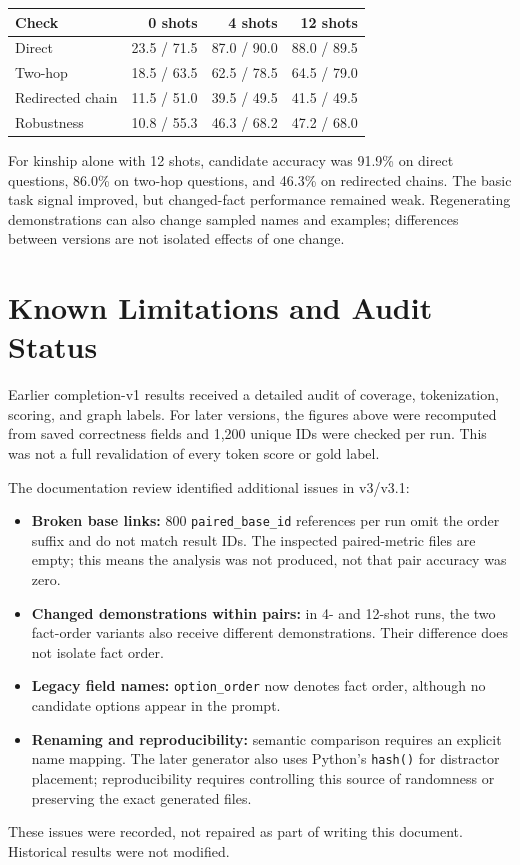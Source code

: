 \documentclass[11pt,a4paper]{article}
\begin{document}
\begin{center}\small
\begin{tabular}{lrrr}
\toprule
Check & 0 shots & 4 shots & 12 shots\\\midrule
Direct & 23.5 / 71.5 & 87.0 / 90.0 & 88.0 / 89.5\\
Two-hop & 18.5 / 63.5 & 62.5 / 78.5 & 64.5 / 79.0\\
Redirected chain & 11.5 / 51.0 & 39.5 / 49.5 & 41.5 / 49.5\\
Robustness & 10.8 / 55.3 & 46.3 / 68.2 & 47.2 / 68.0\\\bottomrule
\end{tabular}
\end{center}
For kinship alone with 12 shots, candidate accuracy was 91.9\% on direct questions, 86.0\% on two-hop questions, and 46.3\% on redirected chains. The basic task signal improved, but changed-fact performance remained weak. Regenerating demonstrations can also change sampled names and examples; differences between versions are not isolated effects of one change.

\section{Known Limitations and Audit Status}
Earlier completion-v1 results received a detailed audit of coverage, tokenization, scoring, and graph labels. For later versions, the figures above were recomputed from saved correctness fields and 1,200 unique IDs were checked per run. This was not a full revalidation of every token score or gold label.

The documentation review identified additional issues in v3/v3.1:
\begin{itemize}
\item \textbf{Broken base links:} 800 \texttt{paired\_base\_id} references per run omit the order suffix and do not match result IDs. The inspected paired-metric files are empty; this means the analysis was not produced, not that pair accuracy was zero.
\item \textbf{Changed demonstrations within pairs:} in 4- and 12-shot runs, the two fact-order variants also receive different demonstrations. Their difference does not isolate fact order.
\item \textbf{Legacy field names:} \texttt{option\_order} now denotes fact order, although no candidate options appear in the prompt.
\item \textbf{Renaming and reproducibility:} semantic comparison requires an explicit name mapping. The later generator also uses Python's \texttt{hash()} for distractor placement; reproducibility requires controlling this source of randomness or preserving the exact generated files.
\end{itemize}
These issues were recorded, not repaired as part of writing this document. Historical results were not modified.
\end{document}
